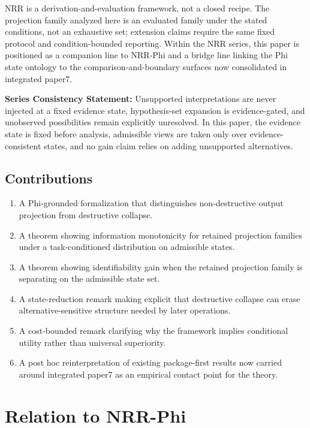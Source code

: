 \documentclass[11pt,a4paper]{article}
\begin{document}
NRR is a derivation-and-evaluation framework, not a closed recipe.
The projection family analyzed here is an evaluated family under the stated conditions, not an exhaustive set; extension claims require the same fixed protocol and condition-bounded reporting.
Within the NRR series, this paper is positioned as a companion line to NRR-Phi and a bridge line linking the Phi state ontology to the comparison-and-boundary surfaces now consolidated in integrated paper7.

\textbf{Series Consistency Statement:}
Unsupported interpretations are never injected at a fixed evidence state, hypothesis-set expansion is evidence-gated, and unobserved possibilities remain explicitly unresolved. In this paper, the evidence state is fixed before analysis, admissible views are taken only over evidence-consistent states, and no gain claim relies on adding unsupported alternatives.

\subsection{Contributions}

\begin{enumerate}
  \item A Phi-grounded formalization that distinguishes non-destructive output projection from destructive collapse.
  \item A theorem showing information monotonicity for retained projection families under a task-conditioned distribution on admissible states.
  \item A theorem showing identifiability gain when the retained projection family is separating on the admissible state set.
  \item A state-reduction remark making explicit that destructive collapse can erase alternative-sensitive structure needed by later operations.
  \item A cost-bounded remark clarifying why the framework implies conditional utility rather than universal superiority.
  \item A post hoc reinterpretation of existing package-first results now carried around integrated paper7 \cite{saito2026boundary} as an empirical contact point for the theory.
\end{enumerate}

\section{Relation to NRR-Phi}
\label{sec:phi}
\end{document}
